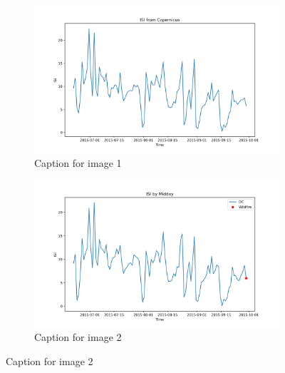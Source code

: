 \begin{figure}[h]
\caption{HELLo}
    \centering
    \begin{subfigure}{0.49\textwidth}
        \centering
        \includegraphics[width=\textwidth]{graphs/2015MesmoSitio/2015CopernicusISI12.png}
        \caption{Caption for image 1}
        \label{fig:img1}
    \end{subfigure}
    \hfill
    \begin{subfigure}{0.49\textwidth}
        \centering
        \includegraphics[width=\textwidth]{graphs/2015MesmoSitio/2015CalcISI12.png}
        \caption{Caption for image 2}
        \label{fig:img2}
    \end{subfigure}
    \label{fig:both_images}
\end{figure}

